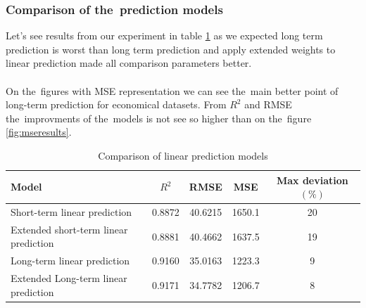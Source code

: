     \subsubsection{Comparison of the~prediction models} \label{subsec:res_comparison}
    Let's see results from our experiment in table \ref{tab:model_comparison} as we expected
    long term prediction is worst than long term prediction and apply extended weights to
    linear prediction made all comparison parameters better.\\
    \\
    On the~figures with MSE representation we can see the~main better point of long-term
    prediction for economical datasets. From $R^2$ and RMSE the~improvments of the~models is not
    see so higher than on the~figure \ref{fig:mseresults}.\\
    \begin{table}[!ht]
        \centering
        \begin{tabular}{|l|c|c|c|c|}
            \hline
            Model & $R^2$ & RMSE & MSE & Max deviation $(\%)$ \\
            \hline
            Short-term linear prediction & 0.8872 & 40.6215 & 1650.1 & 20 \\
            Extended short-term linear prediction & 0.8881 & 40.4662 & 1637.5 & 19 \\
            Long-term linear prediction & 0.9160 & 35.0163 & 1223.3  & 9 \\
            Extended Long-term linear prediction & 0.9171 & 34.7782 & 1206.7 & 8\\
            \hline
        \end{tabular}
        \caption{Comparison of linear prediction models}
        \label{tab:model_comparison}
    \end{table}

